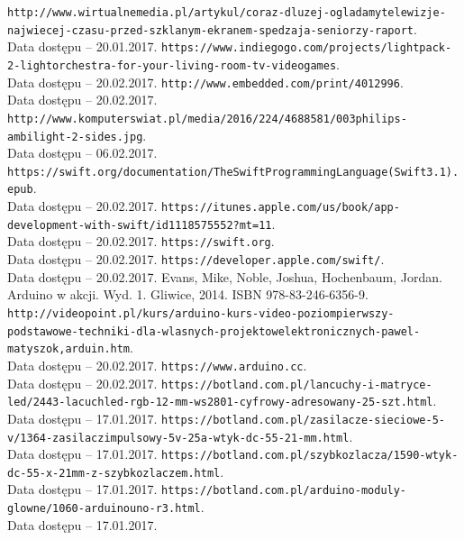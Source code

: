 \documentclass[12pt]{report}
\begin{document}
\begin{thebibliography}{99}
 {\tt http://www.wirtualnemedia.pl/artykul/coraz-dluzej-ogladamy\-telewizje-najwiecej-czasu-przed-szklanym-ekranem-spedzaja\--seniorzy-raport}.\\Data dostępu -- 20.01.2017.
 {\tt https://www.indiegogo.com/projects/lightpack-2-light\-orchestra-for-your-living-room-tv-videogames}. \\Data dostępu -- 20.02.2017.
 {\tt http://www.embedded.com/print/4012996}. \\Data dostępu -- 20.02.2017.
 {\tt http://www.komputerswiat.pl/media/2016/224/4688581/003\-philips-ambilight-2-sides.jpg}. \\Data dostępu -- 06.02.2017.
 {\tt https://swift.org/documentation/TheSwiftProgrammingLanguage\-(Swift3.1).epub}. \\Data dostępu -- 20.02.2017.
 {\tt https://itunes.apple.com/us/book/app-development-with-swift/\-id1118575552?mt=11}. \\Data dostępu -- 20.02.2017.
 {\tt https://swift.org}. \\Data dostępu -- 20.02.2017.
 {\tt https://developer.apple.com/swift/}. \\Data dostępu -- 20.02.2017.
 Evans, Mike, Noble, Joshua, Hochenbaum, Jordan. Arduino w akcji. Wyd. 1. Gliwice, 2014. ISBN 978-83-246-6356-9.
 {\tt http://videopoint.pl/kurs/arduino-kurs-video-poziom\-pierwszy-podstawowe-techniki-dla-wlasnych-projektow\-elektronicznych-pawel-matyszok,arduin.htm}. \\Data dostępu -- 20.02.2017.
 {\tt https://www.arduino.cc}. \\Data dostępu -- 20.02.2017.
 {\tt https://botland.com.pl/lancuchy-i-matryce-led/2443-lacuch\-led-rgb-12-mm-ws2801-cyfrowy-adresowany-25-szt.html}.\\Data dostępu -- 17.01.2017.
 {\tt https://botland.com.pl/zasilacze-sieciowe-5-v/1364-zasilacz\-impulsowy-5v-25a-wtyk-dc-55-21-mm.html}.\\Data dostępu -- 17.01.2017.
 {\tt https://botland.com.pl/szybkozlacza/1590-wtyk-dc-55-x-21\-mm-z-szybkozlaczem.html}.\\Data dostępu -- 17.01.2017.
 {\tt https://botland.com.pl/arduino-moduly-glowne/1060-arduino\-uno-r3.html}.\\Data dostępu -- 17.01.2017.

\end{thebibliography}
\end{document}
